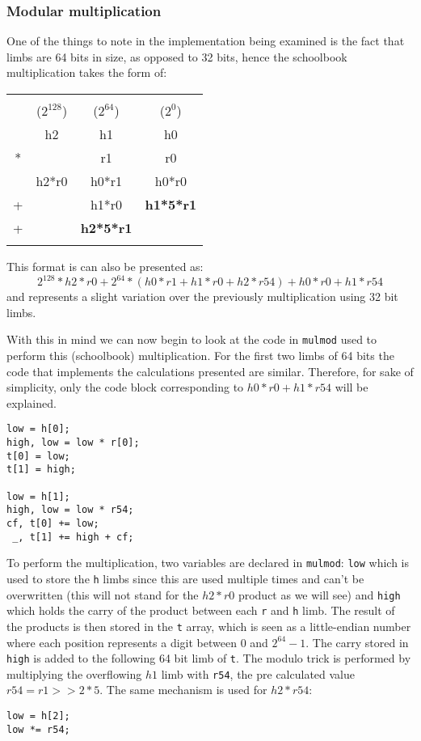 \documentclass[twocolumn]{article}
\begin{document}
\subsubsection{Modular multiplication}
One of the things to note in the implementation being examined is the fact that limbs are 64 bits in size, as opposed to 32 bits, hence the schoolbook multiplication 
takes the form of:

\begin{tabular}{cccc}
    &           &                   &                   \\
    &($2^{128}$)& ($2^{64}$)        & ($2^{0}$)         \\
    & h2        & h1                & h0                \\
*   &           & r1                & r0                \\
\hline
    & h2*r0     & h0*r1             & h0*r0             \\ 
+   &           & h1*r0             & \textbf{h1*5*r1}  \\
+   &           & \textbf{h2*5*r1}  &                   \\
    &           &                   &                   \\
\end{tabular}

This format is can also be presented as: 
$$ 2^{128}*h2*r0 + 2^{64}*(h0*r1+h1*r0+h2*r54) + h0*r0+h1*r54 $$
and represents a slight variation over the previously multiplication using 32 bit limbs.

With this in mind we can now begin to look at the code in \texttt{mulmod} used to perform this (schoolbook) multiplication. For the first two limbs of 64 bits 
the code that implements the calculations presented are similar. Therefore, for sake of simplicity, only the code block corresponding to $h0*r0+h1*r54$ will 
be explained.

\begin{verbatim}
low = h[0];
high, low = low * r[0];
t[0] = low;
t[1] = high;

low = h[1];
high, low = low * r54;
cf, t[0] += low;
 _, t[1] += high + cf;
\end{verbatim}

To perform the multiplication, two variables are declared in \texttt{mulmod}: \texttt{low} which is used to store the \texttt{h} limbs since this are used multiple
times and can't be overwritten (this will not stand for the $h2*r0$ product as we will see) and \texttt{high} which holds the carry of the product between 
each \texttt{r} and \texttt{h} limb. The result of the products is then stored in the \texttt{t} array, which is seen as a little-endian number where each position
represents a digit between $0$ and $2^{64}-1$. The carry stored in \texttt{high} is added to the following 64 bit limb of \texttt{t}. The modulo trick is performed
by multiplying the overflowing $h1$ limb with \texttt{r54}, the pre calculated value $r54=r1>>2*5$. The same mechanism is used for $h2*r54$:
\begin{verbatim}
low = h[2];
low *= r54;
\end{verbatim}
\end{document}
